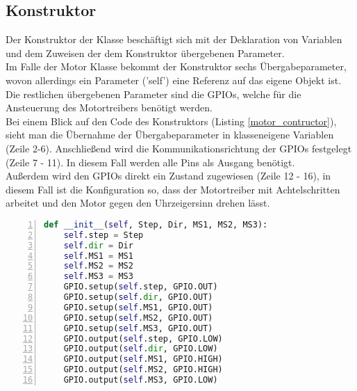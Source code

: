 \subsection{Konstruktor} 
Der Konstruktor der Klasse beschäftigt sich mit der Deklaration von Variablen und dem Zuweisen der dem Konstruktor übergebenen Parameter.\\
Im Falle der Motor Klasse bekommt der Konstruktor sechs Übergabeparameter, wovon allerdings ein Parameter ('self') eine Referenz auf das eigene Objekt ist.\\
Die restlichen übergebenen Parameter sind die \acp{GPIO}, welche für die Ansteuerung des Motortreibers benötigt werden.\\
Bei einem Blick auf den Code des Konstruktors (Listing \ref{motor_contructor}), sieht man die Übernahme der Übergabeparameter in klasseneigene Variablen (Zeile 2-6). Anschließend wird die Kommunikationsrichtung der \acp{GPIO} festgelegt (Zeile 7 - 11). In diesem Fall werden alle Pins als Ausgang benötigt.\\
Außerdem wird den \acp{GPIO} direkt ein Zustand zugewiesen (Zeile 12 - 16), in diesem Fall ist die Konfiguration so, dass der Motortreiber mit Achtelschritten arbeitet und den Motor gegen den Uhrzeigersinn drehen lässt.
\begin{lstlisting}[caption={Konstruktor der Motor Klasse}, language={Python}, label={motor_contructor}, numbers=left]
def __init__(self, Step, Dir, MS1, MS2, MS3):
    self.step = Step
    self.dir = Dir
    self.MS1 = MS1
    self.MS2 = MS2
    self.MS3 = MS3
    GPIO.setup(self.step, GPIO.OUT)
    GPIO.setup(self.dir, GPIO.OUT)
    GPIO.setup(self.MS1, GPIO.OUT)
    GPIO.setup(self.MS2, GPIO.OUT)
    GPIO.setup(self.MS3, GPIO.OUT)
    GPIO.output(self.step, GPIO.LOW)
    GPIO.output(self.dir, GPIO.LOW)
    GPIO.output(self.MS1, GPIO.HIGH)
    GPIO.output(self.MS2, GPIO.HIGH)
    GPIO.output(self.MS3, GPIO.LOW)
\end{lstlisting}

